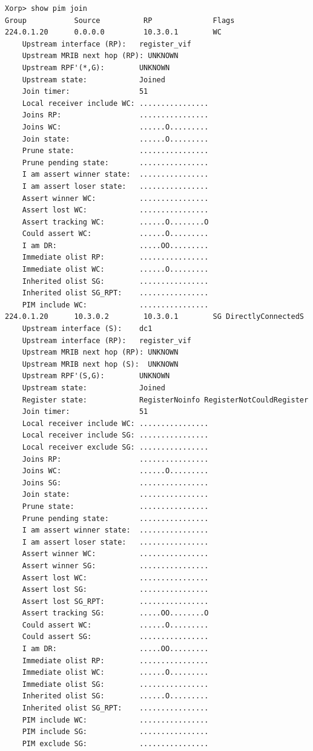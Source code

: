\documentclass[11pt]{report}
\begin{document}
\begin{itemize}
\begin{verbatim}
Xorp> show pim join 
Group           Source          RP              Flags
224.0.1.20      0.0.0.0         10.3.0.1        WC   
    Upstream interface (RP):   register_vif
    Upstream MRIB next hop (RP): UNKNOWN
    Upstream RPF'(*,G):        UNKNOWN
    Upstream state:            Joined 
    Join timer:                51
    Local receiver include WC: ................
    Joins RP:                  ................
    Joins WC:                  ......O.........
    Join state:                ......O.........
    Prune state:               ................
    Prune pending state:       ................
    I am assert winner state:  ................
    I am assert loser state:   ................
    Assert winner WC:          ................
    Assert lost WC:            ................
    Assert tracking WC:        ......O........O
    Could assert WC:           ......O.........
    I am DR:                   .....OO.........
    Immediate olist RP:        ................
    Immediate olist WC:        ......O.........
    Inherited olist SG:        ................
    Inherited olist SG_RPT:    ................
    PIM include WC:            ................
224.0.1.20      10.3.0.2        10.3.0.1        SG DirectlyConnectedS 
    Upstream interface (S):    dc1
    Upstream interface (RP):   register_vif
    Upstream MRIB next hop (RP): UNKNOWN
    Upstream MRIB next hop (S):  UNKNOWN
    Upstream RPF'(S,G):        UNKNOWN
    Upstream state:            Joined 
    Register state:            RegisterNoinfo RegisterNotCouldRegister 
    Join timer:                51
    Local receiver include WC: ................
    Local receiver include SG: ................
    Local receiver exclude SG: ................
    Joins RP:                  ................
    Joins WC:                  ......O.........
    Joins SG:                  ................
    Join state:                ................
    Prune state:               ................
    Prune pending state:       ................
    I am assert winner state:  ................
    I am assert loser state:   ................
    Assert winner WC:          ................
    Assert winner SG:          ................
    Assert lost WC:            ................
    Assert lost SG:            ................
    Assert lost SG_RPT:        ................
    Assert tracking SG:        .....OO........O
    Could assert WC:           ......O.........
    Could assert SG:           ................
    I am DR:                   .....OO.........
    Immediate olist RP:        ................
    Immediate olist WC:        ......O.........
    Immediate olist SG:        ................
    Inherited olist SG:        ......O.........
    Inherited olist SG_RPT:    ................
    PIM include WC:            ................
    PIM include SG:            ................
    PIM exclude SG:            ................
\end{verbatim}


\end{itemize}
\end{document}
